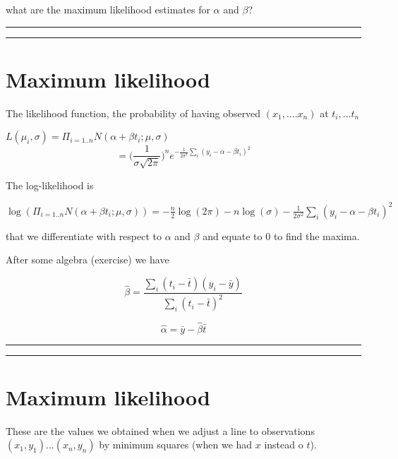 \documentclass[
]{book}
\begin{document}
what are the maximum likelihood estimates for \(\alpha\) and \(\beta\)?

\begin{center}\rule{0.5\linewidth}{0.5pt}\end{center}

\begin{center}\rule{0.5\linewidth}{0.5pt}\end{center}

\hypertarget{maximum-likelihood-4}{%
\section{Maximum likelihood}\label{maximum-likelihood-4}}

The likelihood function, the probability of having observed \((x_1, ....x_n)\) at \(t_i, ...t_n\)

\(L(\mu_i, \sigma)=\Pi_{i=1..n} N(\alpha+\beta t_i;\mu,\sigma)\)
\[=\big( \frac{1}{\sigma \sqrt{2 \pi}}\big)^n e^{-\frac{1}{2\sigma^2} \sum_i(y_i-\alpha-\beta t_i)^2}\]

The log-likelihood is

\(\log(\Pi_{i=1..n} N(\alpha+\beta t_i;\mu,\sigma))=-\frac{n}{2}\log(2\pi)-n\log( \sigma) - \frac{1}{2\sigma^2} \sum_i(y_i-\alpha-\beta t_i)^2\)

that we differentiate with respect to \(\alpha\) and \(\beta\) and equate to 0 to find the maxima.

After some algebra (exercise) we have

\[\hat{\beta}=\frac{\sum_i (t_i-\bar{t})(y_i -\bar{y})}{\sum_i (t_i-\bar{t})^2}\]

\[\hat{\alpha} = \bar{y} - \hat{\beta} \bar{t}\]

\begin{center}\rule{0.5\linewidth}{0.5pt}\end{center}

\begin{center}\rule{0.5\linewidth}{0.5pt}\end{center}

\hypertarget{maximum-likelihood-5}{%
\section{Maximum likelihood}\label{maximum-likelihood-5}}

These are the values we obtained when we adjust a line to observations
\((x_1, y_1)...(x_n, y_n)\) by minimum squares (when we had \(x\) instead o \(t\)).
\end{document}
